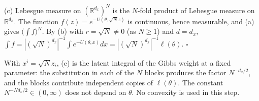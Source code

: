\documentclass[11pt,a4paper]{report}
\begin{document}
(c) Lebesgue measure on \((\mathbb R^{d_x})^N\) is the \(N\)-fold product of Lebesgue measure on \(\mathbb R^{d_x}\). The function \(f(z)=e^{-U(\theta,\sqrt Nz)}\) is continuous, hence measurable, and (a) gives \(\bigl(\int f\bigr)^N\). By (b) with \(r=\sqrt N\ne0\) (as \(N\ge1\)) and \(d=d_x\), \(\int f=|(\sqrt N)^{d_x}|^{-1}\int e^{-U(\theta,x)}dx=|(\sqrt N)^{d_x}|^{-1}\ell(\theta)\). \(\square\)




With \(x^i=\sqrt Nz_i\), (c) is the latent integral of the Gibbs weight at a fixed parameter: the substitution in each of the \(N\) blocks produces the factor \(N^{-d_x/2}\), and the blocks contribute independent copies of \(\ell(\theta)\). The constant \(N^{-Nd_x/2}\in(0,\infty)\) does not depend on \(\theta\). No convexity is used in this step.
\end{document}

